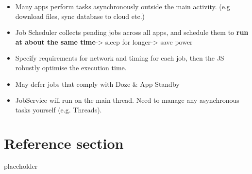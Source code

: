 \documentclass{article}
\begin{document}
\begin{itemize}
  \item Many apps perform tasks asynchronously outside the main activity. (e.g download files, sync database to cloud etc.) 
  \item Job Scheduler collects pending jobs across all apps, and schedule them to \textbf{run at about the same time}-> sleep for longer-> save power 
  \item Specify requirements for network and timing for each job, then the JS robustly optimise the execution time. 
  \item May defer jobs that comply with Doze & App Standby 
  \item JobService will run on the main thread. Need to manage any asynchronous tasks yourself (e.g. Threads).
\end{itemize}

\pagebreak
\section*{Reference section} \label{sec:reference}
\begin{description}
	\item[placeholder] \hfill \\
\end{description}
\end{document}
